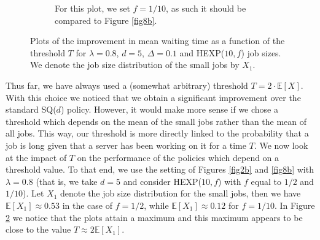 \documentclass[12pt]{report}
\newcommand{\E}{\mathbb{E}}
\begin{document}
\begin{figure}[t]
\begin{center}
\begin{subfigure}{.43\textwidth}
\caption{For this plot, we set $f=1/10$, as such it should be compared to Figure \ref{fig8b}.}
\label{fig12b}
\end{subfigure}
\caption{Plots of the improvement in mean waiting time as a function of the threshold $T$ for $\lambda=0.8$, $d=5$, $\Delta=0.1$ and HEXP($10,f$) job sizes. We denote the job size distribution of the small jobs by $X_1$.}
\label{fig12}
\end{center}
\end{figure}
Thus far, we have always used a (somewhat arbitrary) threshold $T = 2 \cdot \E[X]$. With this choice we noticed that we obtain a significant improvement over the standard SQ($d$) policy. However, it would make more sense if we chose a threshold which depends on the mean of the small jobs rather than the mean of all jobs. This way, our threshold is more directly linked to the probability that a job is long given that a server has been working on it for a time $T$. We now look at the impact of $T$ on the performance of the policies which depend on a threshold value. To that end, we use the setting of Figures \ref{fig2b} and \ref{fig8b} with $\lambda=0.8$ (that is, we take $d=5$ and consider HEXP($10, f$) with $f$ equal to $1/2$ and $1/10$). Let $X_1$ denote the job size distribution for the small jobs, then we have $\E[X_1] \approx 0.53$ in the case of $f=1/2$, while $\E[X_1] \approx 0.12$ for $f=1/10$. In Figure \ref{fig12} we notice that the plots attain a maximum and this maximum appears to be close to the value $T \approx 2 \E[X_1]$.
\end{document}
